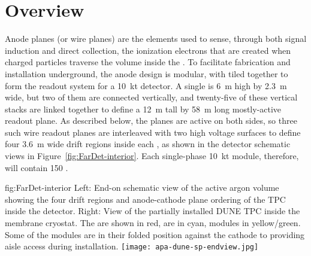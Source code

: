 \section{Overview}
\label{sec:fdsp-apa-intro}

Anode planes (or wire planes) are the  elements used to sense, through both signal induction and direct collection, the ionization electrons that are created when charged particles traverse the \lar volume inside the . To facilitate fabrication and installation underground, the anode design is modular, with  tiled together to form the readout system for a \SI{10}{kt} detector. A single  is \SI{6}{m} high by \SI{2.3}{m} wide, but two of them are connected vertically, and twenty-five of these vertical stacks are linked together to define a \SI{12}{m} tall by \SI{58}{m} long mostly-active readout plane.  As described below, the planes are active on both sides, so three such wire readout planes are interleaved with two high voltage surfaces to define four \SI{3.6}{m} wide drift regions inside each , as shown in the detector schematic views in Figure~\ref{fig:FarDet-interior}.  Each single-phase \SI{10}{kt} module, therefore, will contain 150 .

\begin{dunefigure}{fig:FarDet-interior}
{Left: End-on schematic view of the active argon volume showing the four drift regions and anode-cathode plane ordering of the TPC inside the detector. Right: View of the partially installed DUNE TPC inside the membrane cryostat. The  are shown in red,  are in cyan,  modules in yellow/green.  Some of the  modules are in their folded position against the cathode to providing aisle access during installation.}
\setlength{\fboxsep}{0pt}
\setlength{\fboxrule}{0.5pt}
\texttt{[image: apa-dune-sp-endview.jpg]}\hspace{0.01\textwidth}
\end{dunefigure}

